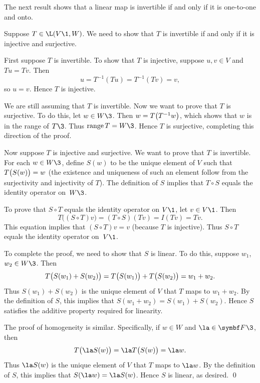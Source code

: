 The next result shows that a linear map is invertible if and only if it is one-to-one and onto.


\proof
Suppose $T\in \L(V\1,W)$.  We need to show that $T$ is
invertible if  and only if it is injective and surjective.

First suppose $T$ is invertible.  To show that $T$ is injective, suppose
$u, v \in V$ and $Tu = Tv$.  Then
\[
u = T^{-1}(Tu) = T^{-1}(Tv) = v,
\]
so $u = v$.  Hence $T$ is injective.

We are still assuming that $T$ is invertible.  Now we want to prove that $T$ is
surjective.  To do this, let $w \in W\3$.  Then $w = T\paren[\big]{T^{-1}w}$, which shows that
$w$ is in the range of $T\3$.  Thus $\ran T = W\3$. Hence $T$ is surjective,
completing this direction of the proof.

Now suppose $T$ is injective and surjective.  We want to prove that $T$ is
invertible.  For each $w \in W\3$, define $S(w)$ to be the unique element of $V$ such
that $T\paren[\big]{S(w)} = w$ (the existence and uniqueness of such an element follow from
the surjectivity and injectivity of $T$). The definition of $S$ implies that $T \circ S$ equals the identity operator
on~$W\3$.

To prove that $S \circ T$ equals the identity operator on $V\1$, let $v \in V\1$.  Then
\[
T\bigl((S \circ T)v \bigr) = (T \circ S)(Tv) = I(Tv) = Tv.
\]
This equation implies that $(S \circ T)v = v$ (because $T$ is injective). Thus $S \circ T$
equals the identity operator on~$V\1$.

To complete the proof, we need to show that
$S$ is linear.  To do this, suppose $w_1$, $w_2 \in W\3$.  Then
\[
T\paren[\big]{S(w_1) + S(w_2)} = T\paren[\big]{S(w_1)} + T\paren[\big]{S(w_2)} = w_1 + w_2.
\]
Thus $S(w_1) + S(w_2)$ is the unique element of $V$ that $T$ maps to
$w_1 + w_2$.  By the definition of $S$, this implies that $S(w_1 + w_2) = S(w_1) + S(w_2)$.  Hence $S$ satisfies the additive property required for linearity.

The proof of homogeneity is similar.  Specifically, if $w \in W$ and $\la \in \F{}\3$, then
\[
T\paren[\big]{\la S(w)} = \la T\paren[\big]{S(w)} = \la w.
\]
Thus $\la S(w)$ is the unique element of $V$ that $T$ maps to $\la w$.  By the
definition of $S$, this implies that $S(\la w) = \la S(w)$.  Hence $S$ is
linear, as desired.
\qed

